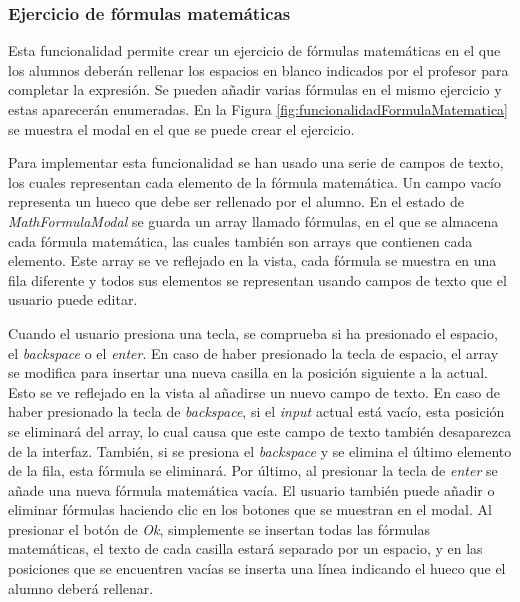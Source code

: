 \subsubsection{Ejercicio de fórmulas matemáticas}
\label{sec:impmatematica}
Esta funcionalidad permite crear un ejercicio de fórmulas matemáticas en el que los alumnos deberán rellenar los espacios en blanco indicados por el profesor para completar la expresión. Se pueden añadir varias fórmulas en el mismo ejercicio y estas aparecerán enumeradas. En la Figura \ref{fig:funcionalidadFormulaMatematica} se muestra el modal en el que se puede crear el ejercicio.

Para implementar esta funcionalidad se han usado una serie de campos de texto, los cuales representan cada elemento de la fórmula matemática. Un campo vacío representa un hueco que debe ser rellenado por el alumno. En el estado de \textit{MathFormulaModal} se guarda un array llamado fórmulas, en el que se almacena cada fórmula matemática, las cuales también son arrays que contienen cada elemento. Este array se ve reflejado en la vista, cada fórmula se muestra en una fila diferente y todos sus elementos se representan usando campos de texto que el usuario puede editar.

Cuando el usuario presiona una tecla, se comprueba si ha presionado el espacio, el \textit{backspace} o el \textit{enter}. En caso de haber presionado la tecla de espacio, el array se modifica para insertar una nueva casilla en la posición siguiente a la actual. Esto se ve reflejado en la vista al añadirse un nuevo campo de texto. En caso de haber presionado la tecla de \textit{backspace}, si el \textit{input} actual está vacío, esta posición se eliminará del array, lo cual causa que este campo de texto también desaparezca de la interfaz. También, si se presiona el \textit{backspace} y se elimina el último elemento de la fila, esta fórmula se eliminará. Por último, al presionar la tecla de \textit{enter} se añade una nueva fórmula matemática vacía. El usuario también puede añadir o eliminar fórmulas haciendo clic en los botones que se muestran en el modal.
Al presionar el botón de \textit{Ok}, simplemente se insertan todas las fórmulas matemáticas, el texto de cada casilla estará separado por un espacio, y en las posiciones que se encuentren vacías se inserta una línea indicando el hueco que el alumno deberá rellenar. 

